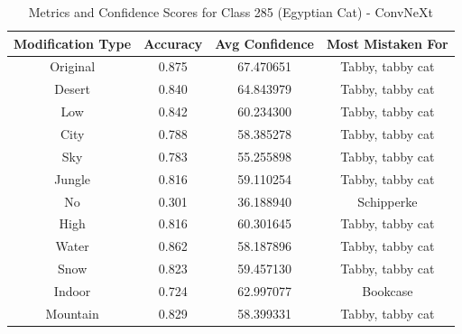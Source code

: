 \begin{table}
	\centering
	\begin{tabular}{|c|c|c|c|}
		\hline
		\textbf{Modification Type} & \textbf{Accuracy} & \textbf{Avg Confidence} & \textbf{Most Mistaken For} \\
		\hline
		Original & 0.875 & 67.470651 & Tabby, tabby cat \\
		\hline
		Desert & 0.840 & 64.843979 & Tabby, tabby cat \\
		\hline
		Low & 0.842 & 60.234300 & Tabby, tabby cat \\
		\hline
		City & 0.788 & 58.385278 & Tabby, tabby cat \\
		\hline
		Sky & 0.783 & 55.255898 & Tabby, tabby cat \\
		\hline
		Jungle & 0.816 & 59.110254 & Tabby, tabby cat \\
		\hline
		No & 0.301 & 36.188940 & Schipperke \\
		\hline
		High & 0.816 & 60.301645 & Tabby, tabby cat \\
		\hline
		Water & 0.862 & 58.187896 & Tabby, tabby cat \\
		\hline
		Snow & 0.823 & 59.457130 & Tabby, tabby cat \\
		\hline
		Indoor & 0.724 & 62.997077 & Bookcase \\
		\hline
		Mountain & 0.829 & 58.399331 & Tabby, tabby cat \\
		\hline
	\end{tabular}
	\caption{Metrics and Confidence Scores for Class 285 (Egyptian Cat) - ConvNeXt}
	\label{tab:metrics_confidence_class_285_convnext}
\end{table}


